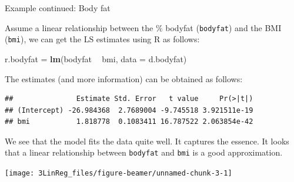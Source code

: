 \documentclass[10pt,ignorenonframetext,]{beamer}
\newenvironment{Shaded}{\begin{snugshade}}{\end{snugshade}}
\newcommand{\KeywordTok}[1]{\textcolor[rgb]{0.13,0.29,0.53}{\textbf{#1}}}
\newcommand{\DataTypeTok}[1]{\textcolor[rgb]{0.13,0.29,0.53}{#1}}
\newcommand{\StringTok}[1]{\textcolor[rgb]{0.31,0.60,0.02}{#1}}
\newcommand{\OperatorTok}[1]{\textcolor[rgb]{0.81,0.36,0.00}{\textbf{#1}}}
\newcommand{\NormalTok}[1]{#1}
\begin{document}
\begin{frame}[fragile]

\begin{block}{Example continued: Body fat}

\vspace{2mm}

Assume a linear relationship between the \% bodyfat (\texttt{bodyfat})
and the BMI (\texttt{bmi}), we can get the LS estimates using R as
follows:

\begin{Shaded}
\begin{Highlighting}[]
\NormalTok{r.bodyfat =}\StringTok{ }\KeywordTok{lm}\NormalTok{(bodyfat }\OperatorTok{~}\StringTok{ }\NormalTok{bmi, }\DataTypeTok{data =}\NormalTok{ d.bodyfat)}
\end{Highlighting}
\end{Shaded}

The estimates (and more information) can be obtained as follows:

\begin{Shaded}
\end{Shaded}

\begin{verbatim}
##               Estimate Std. Error   t value     Pr(>|t|)
## (Intercept) -26.984368  2.7689004 -9.745518 3.921511e-19
## bmi           1.818778  0.1083411 16.787522 2.063854e-42
\end{verbatim}

\end{block}

\end{frame}

\begin{frame}[fragile]

We see that the model fits the data quite well. It captures the essence.
It looks that a linear relationship between \texttt{bodyfat} and
\texttt{bmi} is a good approximation.

\begin{center}\texttt{[image: 3LinReg\_files/figure-beamer/unnamed-chunk-3-1]} \end{center}

\end{frame}
\end{document}
